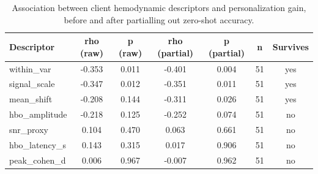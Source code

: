 \begin{table}
\caption{Association between client hemodynamic descriptors and personalization gain, before and after partialling out zero-shot accuracy.}
\label{tab:het}
\begin{tabular}{lcccccc}
\toprule
Descriptor & rho (raw) & p (raw) & rho (partial) & p (partial) & n & Survives \\
\midrule
within_var & -0.353 & 0.011 & -0.401 & 0.004 & 51 & yes \\
signal_scale & -0.347 & 0.012 & -0.351 & 0.011 & 51 & yes \\
mean_shift & -0.208 & 0.144 & -0.311 & 0.026 & 51 & yes \\
hbo_amplitude & -0.218 & 0.125 & -0.252 & 0.074 & 51 & no \\
snr_proxy & 0.104 & 0.470 & 0.063 & 0.661 & 51 & no \\
hbo_latency_s & 0.143 & 0.315 & 0.017 & 0.906 & 51 & no \\
peak_cohen_d & 0.006 & 0.967 & -0.007 & 0.962 & 51 & no \\
\bottomrule
\end{tabular}
\end{table}
